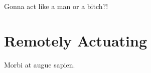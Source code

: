 

\begin{savequote}[50mm]
Gonna act like a man or a bitch?!
\end{savequote}


\chapter{Remotely Actuating}
\label{cha:actuate}

\ifpdf
    \graphicspath{{4_experiments_and_results/figures/PNG/}{4_experiments_and_results/figures/PDF/}{4_experiments_and_results/figures/}}
\else
    \graphicspath{{4_experiments_and_results/figures/EPS/}{4_experiments_and_results/figures/}}
\fi



Morbi at augue sapien.






